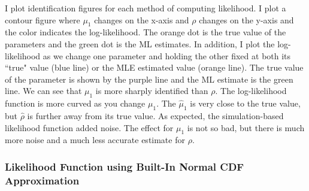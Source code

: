 \documentclass{article}
\begin{document}
\begin{enumerate}
\begin{enumerate}
\bigskip

I plot identification figures for each method of computing likelihood.  I plot a contour figure where $\mu_1$ changes on the x-axis and $\rho$ changes on the y-axis and the color indicates the log-likelihood. The orange dot is the true value of the parameters and the green dot is the ML estimates. In addition, I plot the log-likelihood as we change one parameter and holding the other fixed at both its ``true" value (blue line) or the MLE estimated value (orange line).  The true value of the parameter is shown by the purple line and the ML estimate is the green line. We can see that $\mu_1$ is more sharply identified than $\rho$.  The log-likelihood function is more curved as you change $\mu_1$.  The $\hat\mu_1$ is very close to the true value, but $\hat\rho$ is further away from its true value.  As expected, the simulation-based likelihood function added noise.  The effect for $\mu_1$ is not so bad, but there is much more noise and a much less accurate estimate for $\rho$.

\subsubsection*{Likelihood Function using Built-In Normal CDF Approximation}


\end{enumerate}
\end{enumerate}
\end{document}
